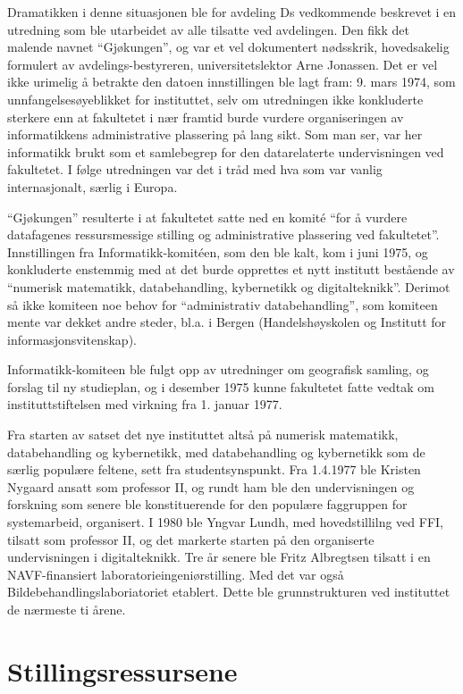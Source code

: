 Dramatikken i denne situasjonen ble for avdeling Ds vedkommende beskrevet i en utredning som ble utarbeidet av alle tilsatte ved avdelingen. Den fikk det malende navnet ``Gjøkungen'', og var et vel dokumentert nødsskrik, hovedsakelig formulert av avdelings-bestyreren, universitetslektor Arne Jonassen. Det er vel ikke urimelig å betrakte den datoen innstillingen ble lagt fram: 9. mars 1974, som unnfangelsesøyeblikket for instituttet, selv om utredningen ikke konkluderte sterkere enn at fakultetet i nær framtid burde vurdere organiseringen av informatikkens administrative plassering på lang sikt. Som man ser, var her informatikk brukt som et samlebegrep for den datarelaterte undervisningen ved fakultetet. I følge utredningen
var det i tråd med hva som var vanlig internasjonalt, særlig i Europa.

``Gjøkungen'' resulterte i at fakultetet satte ned en komité ``for å vurdere datafagenes ressursmessige stilling og administrative plassering ved fakultetet''. Innstillingen fra Informatikk-komitéen, som den ble kalt, kom i juni 1975, og konkluderte enstemmig med at det burde opprettes et nytt institutt bestående av ``numerisk matematikk, databehandling, kybernetikk og digitalteknikk''. Derimot så ikke komiteen noe behov for ``administrativ databehandling'', som komiteen mente var dekket andre steder, bl.a. i Bergen (Handelshøyskolen og Institutt for informasjonsvitenskap).

Informatikk-komiteen ble fulgt opp av utredninger om geografisk samling, og forslag til ny studieplan, og i desember 1975 kunne fakultetet fatte vedtak om instituttstiftelsen med virkning fra 1. januar 1977.

Fra starten av satset det nye instituttet altså på numerisk matematikk, databehandling og kybernetikk, med databehandling og kybernetikk som de særlig populære feltene, sett fra studentsynspunkt. Fra 1.4.1977 ble Kristen Nygaard ansatt som professor II, og rundt ham ble den undervisningen og forskning som senere ble konstituerende for den populære faggruppen for systemarbeid, organisert. I 1980 ble Yngvar Lundh, med hovedstillilng ved FFI, tilsatt som professor II, og det markerte starten på den organiserte undervisningen i digitalteknikk. Tre år senere ble Fritz Albregtsen tilsatt i en NAVF-finansiert laboratorieingeniørstilling. Med det var også Bildebehandlingslaboriatoriet etablert. Dette ble grunnstrukturen ved
instituttet de nærmeste ti årene.

\section{Stillingsressursene}

